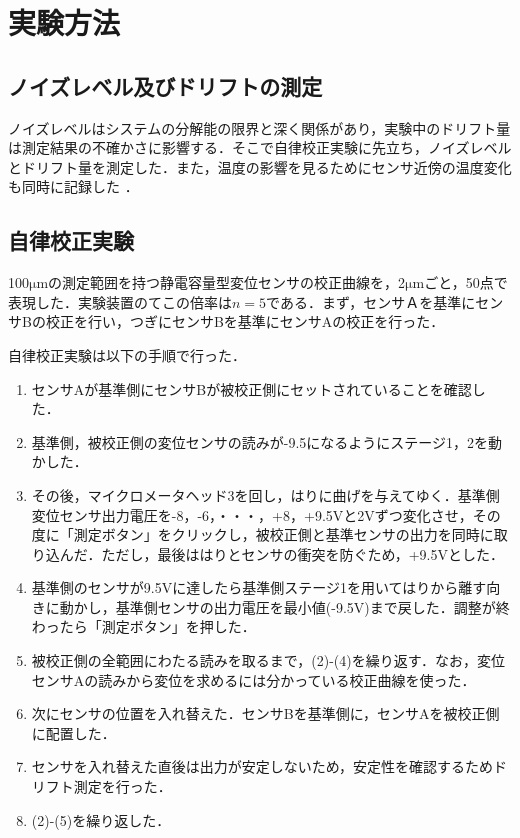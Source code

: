 \section{実験方法}

\subsection{ノイズレベル及びドリフトの測定}
ノイズレベルはシステムの分解能の限界と深く関係があり，実験中のドリフト量は測定結果の不確かさに影響する．そこで自律校正実験に先立ち，ノイズレベルとドリフト量を測定した．また，温度の影響を見るためにセンサ近傍の温度変化も同時に記録した
．

\subsection{自律校正実験}
100$\mathrm{\mu m}$の測定範囲を持つ静電容量型変位センサの校正曲線を，2$\mathrm{\mu m}$ごと，50点で表現した．実験装置のてこの倍率は$n = 5$である．まず，センサＡを基準にセンサBの校正を行い，つぎにセンサBを基準にセンサAの校正を行った．

自律校正実験は以下の手順で行った．
\begin{enumerate}
    \item センサAが基準側にセンサBが被校正側にセットされていることを確認した．
    \item 基準側，被校正側の変位センサの読みが-9.5になるようにステージ1，2を動かした．
    \item その後，マイクロメータヘッド3を回し，はりに曲げを与えてゆく．基準側変位センサ出力電圧を-8，-6，・・・，+8，+9.5Vと2Vずつ変化させ，その度に「測定ボタン」をクリックし，被校正側と基準センサの出力を同時に取り込んだ．ただし，最後ははりとセンサの衝突を防ぐため，+9.5Vとした．
    \item 基準側のセンサが9.5Vに達したら基準側ステージ1を用いてはりから離す向きに動かし，基準側センサの出力電圧を最小値(-9.5V)まで戻した．調整が終わったら「測定ボタン」を押した．
    \item 被校正側の全範囲にわたる読みを取るまで，(2)-(4)を繰り返す．なお，変位センサAの読みから変位を求めるには分かっている校正曲線を使った．
    \item 次にセンサの位置を入れ替えた．センサBを基準側に，センサAを被校正側に配置した．
    \item センサを入れ替えた直後は出力が安定しないため，安定性を確認するためドリフト測定を行った．
    \item (2)-(5)を繰り返した．
\end{enumerate}

